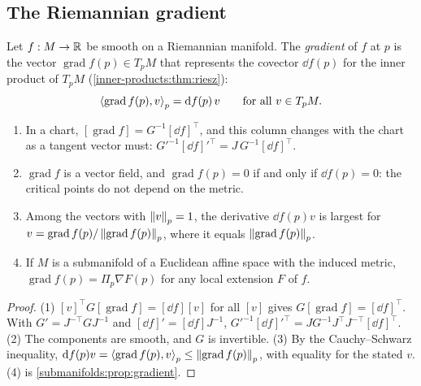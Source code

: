 \begin{notechapter}
\section{The Riemannian gradient}\label{riemannian-optimization:sec:gradient}

\begin{definition}[Gradient]\label{riemannian-optimization:def:gradient}
Let $f:M\to\mathbb{R}$ be smooth on a Riemannian manifold. The \emph{gradient} of
$f$ at $p$ is the vector $\operatorname{grad}f(p)\in T_pM$ that
represents the covector $\dd f(p)$ for the inner product of $T_pM$
(\cref{inner-products:thm:riesz}):
\[
  \left\langle \operatorname{grad}f(p), v \right\rangle_p = \mathrm{d} f(p)\,v
  \qquad\text{for all } v\in T_pM .
\]
\end{definition}

\begin{proposition}\label{riemannian-optimization:prop:gradient}
\begin{enumerate}[nosep]
  \item In a chart,
        $[\operatorname{grad}f] = G^{-1}[\dd f]^\top$, and this column
        changes with the chart as a tangent vector must:
        $G'^{-1}[\dd f]'^\top = J\,G^{-1}[\dd f]^\top$.
  \item $\operatorname{grad}f$ is a vector field, and
        $\operatorname{grad}f(p) = 0$ if and only if $\dd f(p) = 0$: the
        critical points do not depend on the metric.
  \item Among the vectors with $\left\|v\right\|_p = 1$, the derivative
        $\dd f(p)v$ is largest for
        $v = \operatorname{grad}f(p)/\left\|\operatorname{grad}f(p)\right\|_p$,
        where it equals $\left\|\operatorname{grad}f(p)\right\|_p$.
  \item If $M$ is a submanifold of a Euclidean affine space with the
        induced metric, $\operatorname{grad}f(p) = \Pi_p\nabla F(p)$ for
        any local extension $F$ of $f$.
\end{enumerate}
\end{proposition}

\begin{proof}
(1) $[v]^\top G[\operatorname{grad}f] = [\dd f][v]$ for all $[v]$ gives
$G[\operatorname{grad}f] = [\dd f]^\top$. With $G' = J^{-\top}GJ^{-1}$
and $[\dd f]' = [\dd f]J^{-1}$,
$G'^{-1}[\dd f]'^\top = JG^{-1}J^\top J^{-\top}[\dd f]^\top$.
(2) The components are smooth, and $G$ is invertible. (3) By the
Cauchy--Schwarz inequality,
$\mathrm{d} f(p)v = \left\langle \operatorname{grad}f(p), v \right\rangle_p
\leq\left\|\operatorname{grad}f(p)\right\|_p$, with equality for the stated $v$.
(4) is \cref{submanifolds:prop:gradient}.
\end{proof}


\end{notechapter}
